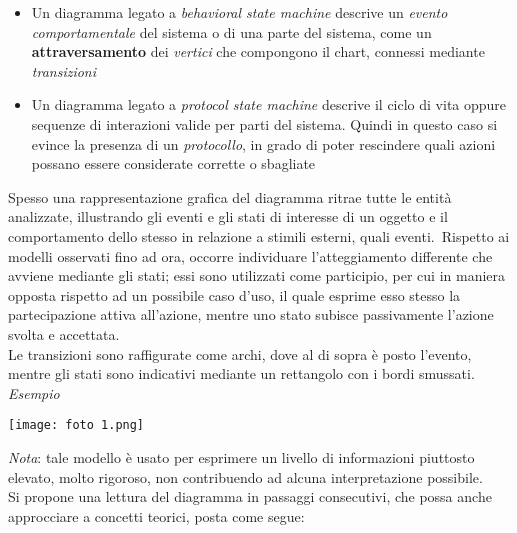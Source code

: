\documentclass{article}
\begin{document}
\begin{itemize}[label={-}]
    \itemsep0em
    \item Un diagramma legato a \textit{behavioral state machine} descrive un \textit{evento comportamentale} del sistema o di una parte del sistema, come un \textbf{attraversamento} dei \textit{vertici} che compongono il chart, connessi mediante \textit{transizioni} 
    \item Un diagramma legato a \textit{protocol state machine} descrive il ciclo di vita oppure sequenze di interazioni valide per parti del sistema. Quindi in questo caso si evince la presenza di un \textit{protocollo}, in grado di poter rescindere quali azioni possano essere considerate corrette o sbagliate
\end{itemize}
Spesso una rappresentazione grafica del diagramma ritrae tutte le entità analizzate, illustrando gli eventi e gli stati di interesse di un oggetto e il comportamento dello stesso in relazione a stimili esterni, quali eventi.\ Rispetto ai modelli osservati fino ad ora, occorre individuare l'atteggiamento differente che avviene mediante gli stati; essi sono utilizzati come participio, per cui in maniera opposta rispetto ad un possibile caso d'uso, il quale esprime esso stesso la partecipazione attiva all'azione, mentre uno stato subisce passivamente l'azione svolta e accettata.\\Le transizioni sono raffigurate come archi, dove al di sopra è posto l'evento, mentre gli stati sono indicativi mediante un rettangolo con i bordi smussati.\vspace*{14pt}\\
\textit{Esempio}
\begin{center}
    \texttt{[image: foto 1.png]}
\end{center}
\textit{Nota}: tale modello è usato per esprimere un livello di informazioni piuttosto elevato, molto rigoroso, non contribuendo ad alcuna interpretazione possibile.\vspace*{14pt}\\
Si propone una lettura del diagramma in passaggi consecutivi, che possa anche approcciare a concetti teorici, posta come segue:
\end{document}

